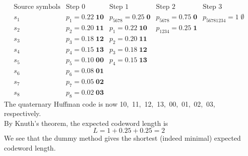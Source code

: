 \documentclass[11pt]{article}
\begin{document}
\[\begin{array}{cllll}
 \text{Source symbols}& \text{Step 0}               & \text{Step 1}                       & \text{Step 2}                        & \text{Step 3}\\[1mm]
         s_1          & p_1    = 0.22\;\mathbf{10} & p_{5678}  = 0.25\;\mathbf{ 0} & p_{5678}  = 0.75\;\mathbf{0} & p_{56781234} = 1\;\mathbf{\emptyset}\\[1mm]
         s_2          & p_2    = 0.20\;\mathbf{11} & p_1       = 0.22\;\mathbf{10} & p_{1234}  = 0.25\;\mathbf{1}\\[1mm]
         s_3          & p_3    = 0.18\;\mathbf{12} & p_2       = 0.20\;\mathbf{11}\\[1mm]
         s_4          & p_4    = 0.15\;\mathbf{13} & p_3       = 0.18\;\mathbf{12}\\[1mm]
         s_5          & p_5    = 0.10\;\mathbf{00} & p_4       = 0.15\;\mathbf{13}\\[1mm]
         s_6          & p_6    = 0.08\;\mathbf{01}\\[1mm]
         s_7          & p_7    = 0.05\;\mathbf{02}\\[1mm]
         s_8          & p_8    = 0.02\;\mathbf{03}
\end{array}\]
The quaternary Huffman code is now 10,\, 11,\, 12,\, 13,\, 00,\, 01,\, 02,\, 03, respectively.\\
By Knuth's theorem, the expected codeword length is
\[
       L = 1 + 0.25 + 0.25 = 2
\]
We see that the dummy method gives the shortest (indeed minimal) expected codeword length.
\end{document}
